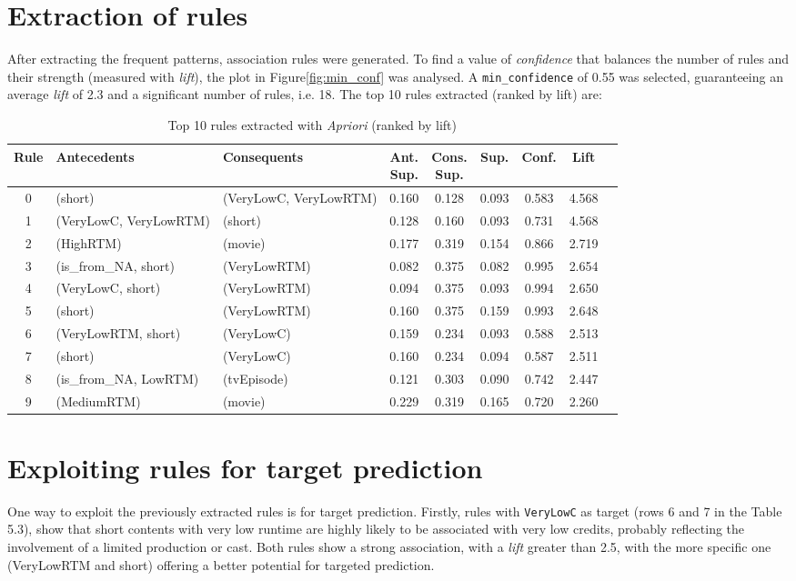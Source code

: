 \section{Extraction of rules}\label{sec:rules}
After extracting the frequent patterns, association rules were generated.
To find a value of \textit{confidence} that balances the number of rules and their strength (measured with \textit{lift}), 
the plot in Figure\ref{fig:min_conf} was analysed. A \texttt{min\_confidence} of 0.55 was selected, guaranteeing an average \textit{lift} of 2.3 and 
a significant number of rules, i.e. 18. The top 10 rules extracted (ranked by lift) are:
\begin{table}[h]
\centering
\begin{tabular}{cllcccccc}
\toprule
\textbf{Rule} & \textbf{Antecedents} & \textbf{Consequents} & \shortstack{\textbf{Ant.}\\\textbf{Sup.}} & \shortstack{\textbf{Cons.}\\\textbf{Sup.}} & \textbf{Sup.} & \textbf{Conf.} & \textbf{Lift} \\
\midrule
0 & (short) & (VeryLowC, VeryLowRTM) & 0.160 & 0.128 & 0.093 & 0.583 & 4.568 \\
1 & (VeryLowC, VeryLowRTM) & (short) & 0.128 & 0.160 & 0.093 & 0.731 & 4.568 \\
2 & (HighRTM) & (movie) & 0.177 & 0.319 & 0.154 & 0.866 & 2.719 \\
3 & (is\_from\_NA, short) & (VeryLowRTM) & 0.082 & 0.375 & 0.082 & 0.995 & 2.654 \\
4 & (VeryLowC, short) & (VeryLowRTM) & 0.094 & 0.375 & 0.093 & 0.994 & 2.650 \\
5 & (short) & (VeryLowRTM) & 0.160 & 0.375 & 0.159 & 0.993 & 2.648 \\
6 & (VeryLowRTM, short) & (VeryLowC) & 0.159 & 0.234 & 0.093 & 0.588 & 2.513 \\
7 & (short) & (VeryLowC) & 0.160 & 0.234 & 0.094 & 0.587 & 2.511 \\
8 & (is\_from\_NA, LowRTM) & (tvEpisode) & 0.121 & 0.303 & 0.090 & 0.742 & 2.447 \\
9 & (MediumRTM) & (movie) & 0.229 & 0.319 & 0.165 & 0.720 & 2.260 \\
\bottomrule
\end{tabular}
\caption{Top 10 rules extracted with \textit{Apriori} (ranked by lift)}
\end{table}


\section{Exploiting rules for target prediction}\label{sec:prediction_rules}
One way to exploit the previously extracted rules is for target prediction. 
Firstly, rules with \texttt{VeryLowC} as target (rows 6 and 7 in the Table 5.3), show that short contents with very low runtime are highly likely to be associated with very low credits, 
probably reflecting the involvement of a limited production or cast. 
Both rules show a strong association, with a \textit{lift} greater than 2.5, with the more specific one (VeryLowRTM and short) offering a better potential for targeted prediction. \\

